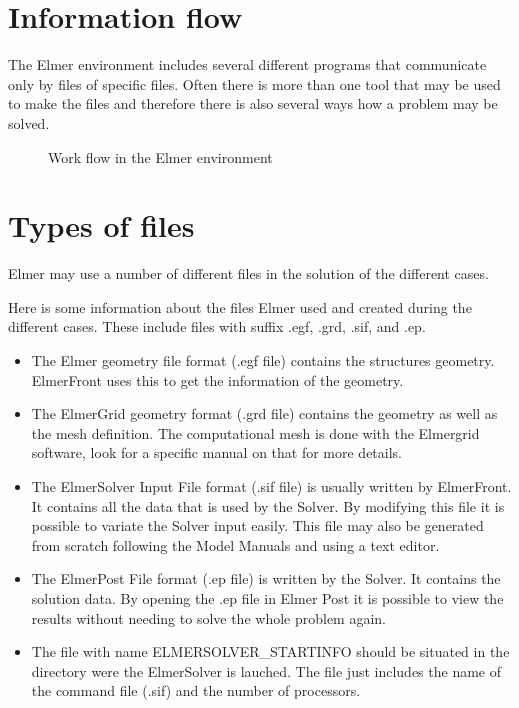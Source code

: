 \appendix
{}

\section{Information flow}

The Elmer environment includes several different programs that 
communicate only by files of specific files. Often there is
more than one tool that may be used to make the files and 
therefore there is also several ways how a problem may be solved.


\begin{figure}[tbhp]
\vspace{10mm}
\begin{center}
\caption{Work flow in the Elmer environment}
\end{center}
\end{figure}


\section{Types of files}

Elmer may use a number of different files in the solution of the
different cases.

Here is some information about the files Elmer used and created during the
different cases. These include files with suffix
.egf, .grd, .sif, and .ep.
\begin{itemize}
\item The Elmer geometry file format (.egf file) contains the structures
      geometry. ElmerFront uses this to get the information of the geometry.
\item The ElmerGrid geometry format (.grd file) contains the
      geometry as well as the mesh definition. The computational mesh
      is done with the Elmergrid software, look for a specific manual
      on that for more details.
\item The ElmerSolver Input File format (.sif file) is usually written by
      ElmerFront. It contains all the data that is used by the Solver.
      By modifying this  file it is possible to variate the Solver input
      easily. This file may also be generated from scratch following
      the Model Manuals and using a text editor.
\item The ElmerPost File format (.ep file) is written by the Solver.
      It contains the solution data. By opening the .ep file in Elmer
      Post it is possible to view the results without needing to solve
      the whole problem again.
\item The file with name ELMERSOLVER\_STARTINFO should be
      situated in the directory were the ElmerSolver is lauched.
      The file just includes the name of the command file (.sif) and
      the number of processors.
\end{itemize}


